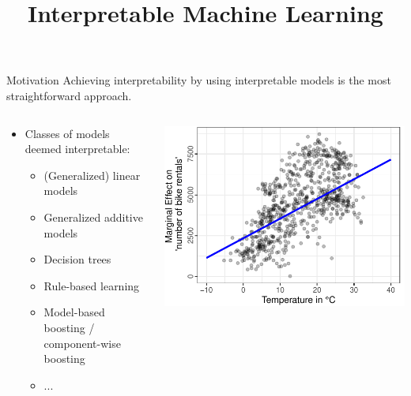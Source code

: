 \documentclass[11pt,compress,t,notes=noshow, aspectratio=169, xcolor=table]{beamer}
\title{Interpretable Machine Learning}
\date{}
\begin{document}
\newcommand{\titlefigure}{figure/whitebox}
\newcommand{\learninggoals}{
\item Why should we use interpretable models at all?
}


\begin{frame}{Motivation}
Achieving interpretability by using interpretable models is the most straightforward approach.
\bigskip
\begin{columns}[T]
    \begin{column}{0.45\textwidth}
    \begin{itemize}
        \bigskip
        \item Classes of models deemed interpretable:
        \begin{itemize}
            \item (Generalized) linear models
            \item Generalized additive models
            \item Decision trees
            \item Rule-based learning
            \item Model-based boosting / component-wise boosting
            \item ...
        \end{itemize}
    \end{itemize}
    \end{column}
    \begin{column}{0.45\textwidth}  %
  \includegraphics[width = \textwidth]{slides/interpretable-models/figure/main_effect_lm_temp.pdf}

\end{column}
\end{columns}
\end{frame}
\end{document}
